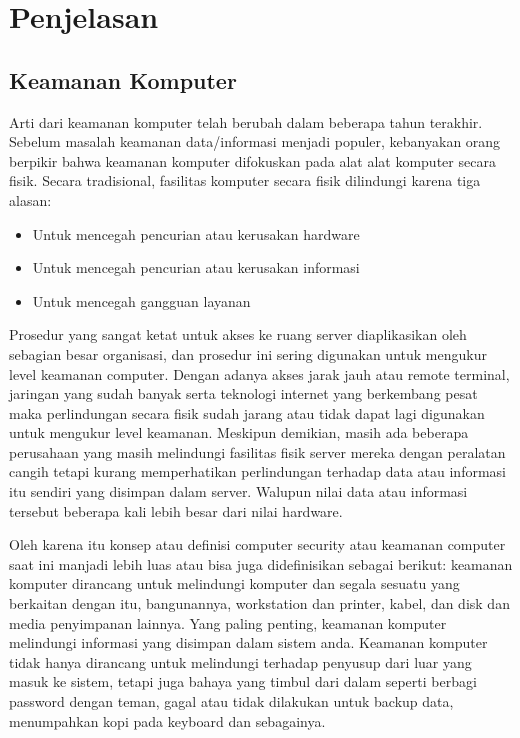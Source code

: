 \documentclass[conference]{IEEEtran}
\begin{document}
\section{Penjelasan}
\subsection{Keamanan Komputer}
Arti dari keamanan komputer telah berubah dalam beberapa tahun terakhir. Sebelum masalah keamanan data/informasi menjadi populer, kebanyakan orang berpikir bahwa keamanan komputer difokuskan pada alat alat komputer secara fisik. Secara tradisional, fasilitas komputer secara fisik dilindungi karena tiga alasan:
\begin{itemize}
    \item Untuk mencegah pencurian atau kerusakan hardware
    \item Untuk mencegah pencurian atau kerusakan informasi
    \item Untuk mencegah gangguan layanan
\end{itemize}

Prosedur yang sangat ketat untuk akses ke ruang server diaplikasikan oleh sebagian besar organisasi, dan prosedur ini sering digunakan untuk mengukur level keamanan computer. Dengan adanya akses jarak jauh atau remote terminal, jaringan yang sudah banyak serta teknologi internet yang berkembang pesat maka perlindungan secara fisik sudah jarang atau tidak dapat lagi digunakan untuk mengukur level keamanan. Meskipun demikian, masih ada beberapa perusahaan yang masih melindungi fasilitas fisik server mereka dengan peralatan cangih tetapi kurang memperhatikan perlindungan terhadap data atau informasi itu sendiri yang disimpan dalam server. Walupun nilai data atau informasi tersebut beberapa kali lebih besar dari nilai hardware.

Oleh karena itu konsep atau definisi computer security atau keamanan computer saat ini manjadi lebih luas atau bisa juga didefinisikan sebagai berikut: keamanan komputer dirancang untuk melindungi komputer dan segala sesuatu yang berkaitan dengan itu, bangunannya, workstation dan printer, kabel, dan disk dan media penyimpanan lainnya. Yang paling penting, keamanan komputer melindungi informasi yang disimpan dalam sistem anda. Keamanan komputer tidak hanya dirancang untuk melindungi terhadap penyusup dari luar yang masuk ke sistem, tetapi juga bahaya yang timbul dari dalam seperti berbagi password dengan teman, gagal atau tidak dilakukan untuk backup data, menumpahkan kopi pada keyboard dan sebagainya.
\end{document}
